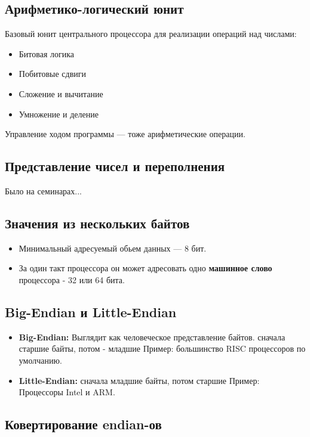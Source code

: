 \subsection{Арифметико-логический юнит}

Базовый юнит центрального процессора для реализации операций над числами:
\begin{itemize}
	\item Битовая логика
	\item Побитовые сдвиги
	\item Сложение и вычитание
	\item Умножение и деление
\end{itemize}

 Управление ходом программы --- тоже арифметические операции. 
 
 \subsection{Представление чисел и переполнения}
 Было на семинарах...
 
 \subsection{Значения из нескольких байтов}
 
 \begin{itemize}
 	\item Минимальный адресуемый обьем данных --- 8 бит.
 	\item За один такт процессора он может адресовать одно \textbf{машинное слово} процессора - 32 или 64 бита.
 \end{itemize}

\subsection{Big-Endian и Little-Endian}

\begin{itemize}
	\item \textbf{Big-Endian:}
	Выглядит как человеческое представление байтов.
	сначала старшие байты, потом - младшие
	Пример: большинство RISC процессоров по умолчанию.
	\item \textbf{Little-Endian:}
	сначала младшие байты, потом старшие
	Пример: Процессоры Intel и ARM.
\end{itemize}

\subsection{Ковертирование endian-ов}


